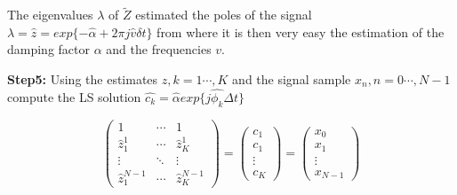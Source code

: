 The eigenvalues $\lambda$ of $\tilde{Z}$ estimated the poles of the signal $\lambda=\hat{z}=exp\{-\hat{\alpha}+2\pi j\hat{v} \delta t\}$ from where it is then very easy the estimation of the damping factor $\alpha$ and the frequencies $v$.

\textbf{Step5:} Using the estimates $\hat{z}, k=1\cdots,K$ and the signal sample $x_{n},n=0\cdots,N-1$ compute the LS solution $\hat{c_{k}}=\hat{\alpha}exp\{j\hat{\phi_{k}}\Delta t\}$

\begin{equation}
 \begin{pmatrix}
  1 & \cdots & 1 \\
  \hat{z}^{1}_{1} & \cdots &  \hat{z}^{1}_{K}  \\
  \vdots  & \ddots & \vdots  \\
    \hat{z}^{N-1}_{1} &  \cdots &   \hat{z}^{N-1}_{K} 
 \end{pmatrix}=
  \begin{pmatrix}
  c_{1}\\
  c_{1}\\
  \vdots\\
  c_{K}
   \end{pmatrix}= 
  \begin{pmatrix}
  x_{0}\\
  x_{1}\\
  \vdots\\
  x_{N-1}
   \end{pmatrix}
\end{equation}


